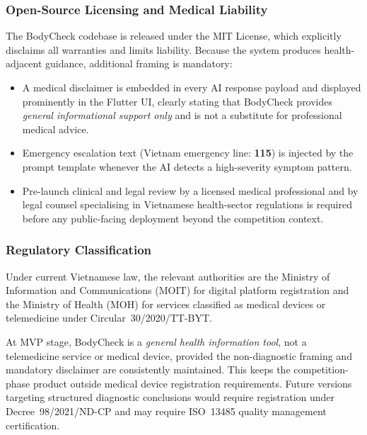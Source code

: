 \subsubsection*{Open-Source Licensing and Medical Liability}

The BodyCheck codebase is released under the MIT License, which explicitly
disclaims all warranties and limits liability. Because the system produces
health-adjacent guidance, additional framing is mandatory:

\begin{itemize}[leftmargin=2em, itemsep=3pt, topsep=4pt]
  \item A medical disclaimer is embedded in every AI response payload and
        displayed prominently in the Flutter UI, clearly stating that
        BodyCheck provides \emph{general informational support only} and is
        not a substitute for professional medical advice.
  \item Emergency escalation text (Vietnam emergency line: \textbf{115})
        is injected by the prompt template whenever the AI detects a
        high-severity symptom pattern.
  \item Pre-launch clinical and legal review by a licensed medical
        professional and by legal counsel specialising in Vietnamese
        health-sector regulations is required before any public-facing
        deployment beyond the competition context.
\end{itemize}

\subsubsection*{Regulatory Classification}

Under current Vietnamese law, the relevant authorities are the Ministry of
Information and Communications (MOIT) for digital platform registration
and the Ministry of Health (MOH) for services classified as medical devices
or telemedicine under Circular~30/2020/TT-BYT.

At MVP stage, BodyCheck is a \emph{general health information tool}, not a
telemedicine service or medical device, provided the non-diagnostic framing
and mandatory disclaimer are consistently maintained. This keeps the
competition-phase product outside medical device registration requirements.
Future versions targeting structured diagnostic conclusions would require
registration under Decree~98/2021/ND-CP and may require ISO~13485
quality management certification.

